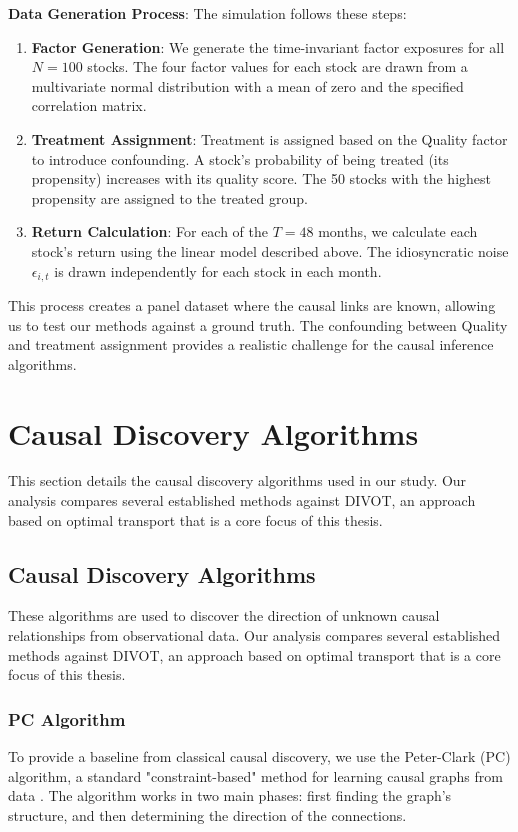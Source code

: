 \textbf{Data Generation Process}: The simulation follows these steps:
\begin{enumerate}
    \itemsep0em 
    \item \textbf{Factor Generation}: We generate the time-invariant factor exposures for all $N=100$ stocks. The four factor values for each stock are drawn from a multivariate normal distribution with a mean of zero and the specified correlation matrix.
    \item \textbf{Treatment Assignment}: Treatment is assigned based on the Quality factor to introduce confounding. A stock's probability of being treated (its propensity) increases with its quality score. The 50 stocks with the highest propensity are assigned to the treated group.
    \item \textbf{Return Calculation}: For each of the $T=48$ months, we calculate each stock's return using the linear model described above. The idiosyncratic noise $\epsilon_{i,t}$ is drawn independently for each stock in each month.
\end{enumerate}

This process creates a panel dataset where the causal links are known, allowing us to test our methods against a ground truth. The confounding between Quality and treatment assignment provides a realistic challenge for the causal inference algorithms.

\section{Causal Discovery Algorithms}
\label{sec:methodologies}

This section details the causal discovery algorithms used in our study. Our analysis compares several established methods against DIVOT, an approach based on optimal transport that is a core focus of this thesis.

\subsection{Causal Discovery Algorithms}

These algorithms are used to discover the direction of unknown causal relationships from observational data. Our analysis compares several established methods against DIVOT, an approach based on optimal transport that is a core focus of this thesis.

\subsubsection{PC Algorithm}
To provide a baseline from classical causal discovery, we use the Peter-Clark (PC) algorithm, a standard "constraint-based" method for learning causal graphs from data \cite{Spirtes00}. The algorithm works in two main phases: first finding the graph's structure, and then determining the direction of the connections.


